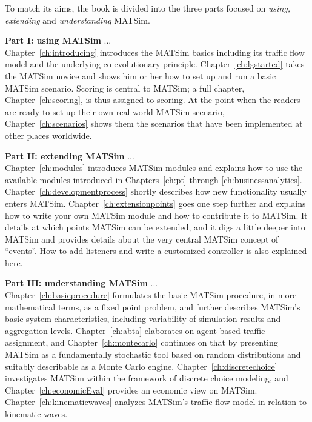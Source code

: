 To match its aims, the book is divided into the three parts focused on \emph{using, extending} and \emph{understanding} MATSim.

\textbf{Part I: using MATSim} ... \\
Chapter~\ref{ch:introducing} introduces the MATSim basics including its traffic flow model and the underlying co-evolutionary principle. Chapter~\ref{ch:lgstarted} takes the MATSim novice and shows him or her how to set up and run a basic MATSim scenario. Scoring is central to MATSim; a full chapter, Chapter~\ref{ch:scoring}, is thus assigned to scoring. At the point when the readers are ready to set up their own real-world MATSim scenario, Chapter~\ref{ch:scenarios} shows them the scenarios that have been implemented at other places worldwide. 

\textbf{Part II: extending MATSim} ... \\
Chapter~\ref{ch:modules} introduces MATSim modules and explains how to use the available modules introduced in Chapters~\ref{ch:pt} through \ref{ch:businessanalytics}. Chapter~\ref{ch:developmentprocess} shortly describes how new functionality usually enters MATSim. Chapter~\ref{ch:extensionpoints} goes one step further and explains how to write your own MATSim module and how to contribute it to MATSim. It details at which points MATSim can be extended, and it digs a little deeper into MATSim and provides details about the very central MATSim concept of ``events''. How to add listeners and write a customized controller is also explained here.

\textbf{Part III: understanding MATSim} ... \\
Chapter~\ref{ch:basicprocedure} formulates the basic MATSim procedure, in more mathematical terms, as a fixed point problem, and further describes MATSim's basic system characteristics, including variability of simulation results and aggregation levels. Chapter~\ref{ch:abta} elaborates on agent-based traffic assignment, and Chapter~\ref{ch:montecarlo} continues on that by presenting MATSim as a fundamentally stochastic tool based on random distributions and suitably describable as a Monte Carlo engine. Chapter~\ref{ch:discretechoice} investigates MATSim within the framework of discrete choice modeling, and Chapter~\ref{ch:economicEval} provides an economic view on MATSim. Chapter~\ref{ch:kinematicwaves} analyzes MATSim's traffic flow model in relation to kinematic waves.


